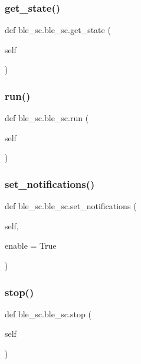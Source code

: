 \subsubsection{\texorpdfstring{get\+\_\+state()}{get\_state()}}
{\footnotesize\ttfamily def ble\+\_\+sc.\+ble\+\_\+sc.\+get\+\_\+state (\begin{DoxyParamCaption}\item[{}]{self }\end{DoxyParamCaption})}

\mbox{\label{classble__sc_1_1ble__sc_ad54a981de790eff2f9543fd28c1d21fb}} 
\subsubsection{\texorpdfstring{run()}{run()}}
{\footnotesize\ttfamily def ble\+\_\+sc.\+ble\+\_\+sc.\+run (\begin{DoxyParamCaption}\item[{}]{self }\end{DoxyParamCaption})}

\mbox{\label{classble__sc_1_1ble__sc_a1de425ebd84b004a47b68be4707f0c81}} 
\subsubsection{\texorpdfstring{set\+\_\+notifications()}{set\_notifications()}}
{\footnotesize\ttfamily def ble\+\_\+sc.\+ble\+\_\+sc.\+set\+\_\+notifications (\begin{DoxyParamCaption}\item[{}]{self,  }\item[{}]{enable = {\ttfamily True} }\end{DoxyParamCaption})}

\mbox{\label{classble__sc_1_1ble__sc_ae3ccbb4eed28452868695db039c1d9d2}} 
\subsubsection{\texorpdfstring{stop()}{stop()}}
{\footnotesize\ttfamily def ble\+\_\+sc.\+ble\+\_\+sc.\+stop (\begin{DoxyParamCaption}\item[{}]{self }\end{DoxyParamCaption})}



